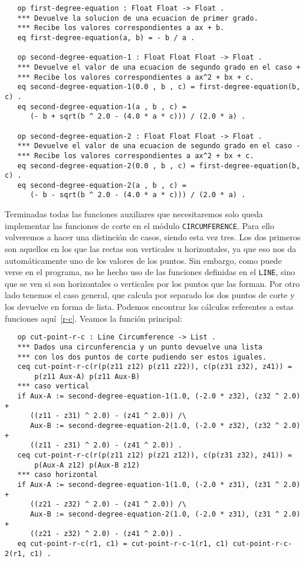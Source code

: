 {\codesize
\begin{verbatim}
   op first-degree-equation : Float Float -> Float .
   *** Devuelve la solucion de una ecuacion de primer grado.
   *** Recibe los valores correspondientes a ax + b.
   eq first-degree-equation(a, b) = - b / a .

   op second-degree-equation-1 : Float Float Float -> Float .
   *** Devuelve el valor de una ecuacion de segundo grado en el caso +
   *** Recibe los valores correspondientes a ax^2 + bx + c.
   eq second-degree-equation-1(0.0 , b , c) = first-degree-equation(b, c) .
   eq second-degree-equation-1(a , b , c) = 
      (- b + sqrt(b ^ 2.0 - (4.0 * a * c))) / (2.0 * a) . 

   op second-degree-equation-2 : Float Float Float -> Float .
   *** Devuelve el valor de una ecuacion de segundo grado en el caso -
   *** Recibe los valores correspondientes a ax^2 + bx + c.
   eq second-degree-equation-2(0.0 , b , c) = first-degree-equation(b, c) .
   eq second-degree-equation-2(a , b , c) = 
      (- b - sqrt(b ^ 2.0 - (4.0 * a * c))) / (2.0 * a) .
\end{verbatim}
}

Terminadas todas las funciones auxiliares que necesitaremos solo queda implementar las funciones de corte en el módulo \texttt{CIRCUMFERENCE}. Para ello volveremos a hacer una distinción de casos, siendo esta vez tres. Los dos primeros son aquellos en los que las rectas son verticales u horizontales, ya que eso nos da automáticamente uno de los valores de los puntos. Sin embargo, como puede verse en el programa, no he hecho uso de las funciones definidas en el \texttt{LINE}, sino que se ven si son horizontales o verticales por los puntos que las forman. Por otro lado tenemos el caso general, que calcula por separado los dos puntos de corte y los devuelve en forma de lista. Podemos encontrar los cálculos referentes a estas funciones aquí~\ref{r-c}. Veamos la función principal:

{\codesize
\begin{verbatim}
   op cut-point-r-c : Line Circumference -> List .
   *** Dados una circunferencia y un punto devuelve una lista 
   *** con los dos puntos de corte pudiendo ser estos iguales.
   ceq cut-point-r-c(r(p(z11 z12) p(z11 z22)), c(p(z31 z32), z41)) = 
       p(z11 Aux-A) p(z11 Aux-B)
   *** caso vertical 
   if Aux-A := second-degree-equation-1(1.0, (-2.0 * z32), (z32 ^ 2.0) + 
      ((z11 - z31) ^ 2.0) - (z41 ^ 2.0)) /\
      Aux-B := second-degree-equation-2(1.0, (-2.0 * z32), (z32 ^ 2.0) + 
      ((z11 - z31) ^ 2.0) - (z41 ^ 2.0)) .
   ceq cut-point-r-c(r(p(z11 z12) p(z21 z12)), c(p(z31 z32), z41)) = 
       p(Aux-A z12) p(Aux-B z12)
   *** caso horizontal
   if Aux-A := second-degree-equation-1(1.0, (-2.0 * z31), (z31 ^ 2.0) + 
      ((z21 - z32) ^ 2.0) - (z41 ^ 2.0)) /\
      Aux-B := second-degree-equation-2(1.0, (-2.0 * z31), (z31 ^ 2.0) + 
      ((z21 - z32) ^ 2.0) - (z41 ^ 2.0)) .
   eq cut-point-r-c(r1, c1) = cut-point-r-c-1(r1, c1) cut-point-r-c-2(r1, c1) .
\end{verbatim}
}

